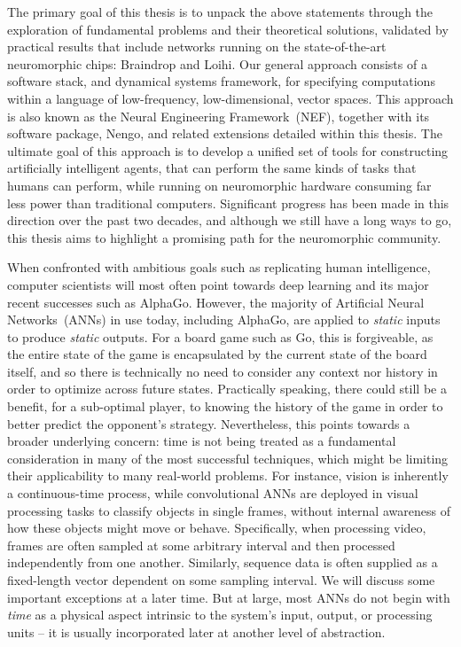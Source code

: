 The primary goal of this thesis is to unpack the above statements through the exploration of fundamental problems and their theoretical solutions, validated by practical results that include networks running on the state-of-the-art neuromorphic chips: Braindrop and Loihi.
Our general approach consists of a software stack, and dynamical systems framework,
for specifying computations within a language of low-frequency, low-dimensional, vector spaces.
This approach is also known as the Neural Engineering Framework~(NEF), together with
its software package, Nengo, and related extensions detailed within this thesis.
The ultimate goal of this approach is to develop a unified set of tools for constructing
artificially intelligent agents, that can perform the same kinds of tasks that
humans can perform, while running on neuromorphic hardware consuming far less
power than traditional computers.
Significant progress has been made in this direction over the past two decades, and although we still
have a long ways to go, this thesis aims to highlight a promising path for the neuromorphic community.

When confronted with ambitious goals such as replicating human intelligence, computer scientists will most often point towards
deep learning and its major recent successes such as AlphaGo.
However, the majority of Artificial Neural Networks~(ANNs) in use today, including AlphaGo, are applied to \emph{static} inputs to produce \emph{static} outputs.
For a board game such as Go, this is forgiveable, as the entire state of the game is encapsulated by the current state of the board itself, and so there is technically no need to consider any context nor history in order to optimize across future states.
Practically speaking, there could still be a benefit, for a sub-optimal player, to knowing the history of the game in order to better predict the opponent's strategy.
Nevertheless, this points towards a broader underlying concern: time is not being treated as a fundamental consideration in many of the most successful techniques, which might be limiting their applicability to many real-world problems.
For instance, vision is inherently a continuous-time process, while convolutional ANNs are deployed in visual processing tasks to classify objects in single frames, without internal awareness of how these objects might move or behave.
Specifically, when processing video, frames are often sampled at some arbitrary interval and then processed independently from one another.
Similarly, sequence data is often supplied as a fixed-length vector dependent on some sampling interval.
We will discuss some important exceptions at a later time.
But at large, most ANNs do not begin with {\it time} as a physical aspect intrinsic to the system's input, output, or processing units -- it is usually incorporated later at another level of abstraction.

